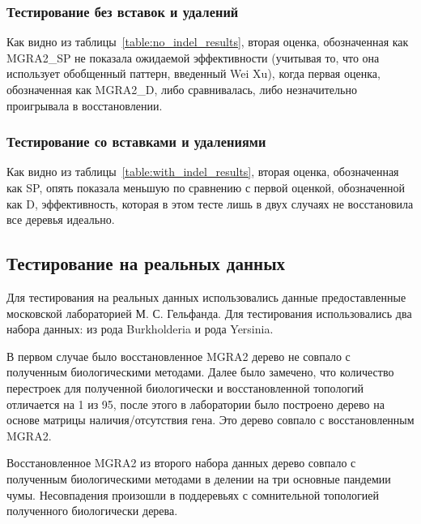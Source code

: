 \subsubsection{Тестирование без вставок и удалений}

Как видно из таблицы~\ref{table:no_indel_results}, вторая оценка, обозначенная как MGRA2\_SP не показала ожидаемой эффективности
(учитывая то, что она использует обобщенный паттерн, введенный Wei Xu),
когда первая оценка, обозначенная как MGRA2\_D, либо сравнивалась, либо незначительно проигрывала в восстановлении.

\subsubsection{Тестирование со вставками и удалениями}

Как видно из таблицы~\ref{table:with_indel_results}, вторая оценка, обозначенная как SP, опять показала меньшую
по сравнению с первой оценкой, обозначенной как D, эффективность, которая в этом тесте лишь в двух случаях не восстановила все деревья идеально.

\subsection{Тестирование на реальных данных}
Для тестирования на реальных данных использовались данные предоставленные московской лабораторией М. С. Гельфанда.
Для тестирования использовались два набора данных: из рода Burkholderia и рода Yersinia.

В первом случае было восстановленное MGRA2 дерево не совпало с полученным биологическими методами.
Далее было замечено, что количество перестроек для полученной биологически и восстановленной топологий отличается на 1 из 95,
после этого в лаборатории было построено дерево на основе матрицы наличия/отсутствия гена.
Это дерево совпало с восстановленным MGRA2.

Восстановленное MGRA2 из второго набора данных дерево совпало с полученным биологическими методами в делении на три основные пандемии чумы.
Несовпадения произошли в поддеревьях с сомнительной топологией полученного биологически дерева.
